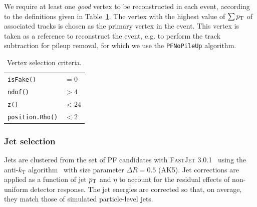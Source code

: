 We require at least one {\it good} vertex to be reconstructed in each event, according to the
definitions given in Table~\ref{tab:object_vertex}.
The vertex with the highest value of $\sum p_{\mathrm{T}}$ of associated tracks is chosen as the primary vertex
in the event. This vertex is taken as a reference to reconstruct the event, e.g. to perform the
track subtraction for pileup removal, for which we use the {\tt PFNoPileUp} algorithm.

\begin{table}[htdp]
\caption{Vertex selection criteria. \label{tab:object_vertex}}
\begin{center}
\begin{tabular}{l l}
\toprule
\texttt{isFake()} & $= 0$ \\
\texttt{ndof()} & $> 4$ \\
\texttt{z()} & $< 24$ \\
\texttt{position.Rho()} & $< 2$ \\
\bottomrule
\end{tabular}
\end{center}
\end{table}


\subsubsection{Jet selection \label{sec:object_jets}}

Jets are clustered from the set of PF candidates with \textsc{FastJet 3.0.1}~\cite{Cacciari:2011ma}
using the anti-$k_\textrm{T}$ algorithm~\cite{antikt} with size parameter $\Delta R=0.5$ (AK5).  
Jet corrections are applied as a function of jet $p_{\mathrm{T}}$ and $\eta$ to account for the residual
effects of non-uniform detector response.  
The jet energies are corrected so that, on average, they match those of simulated particle-level
jets. 




